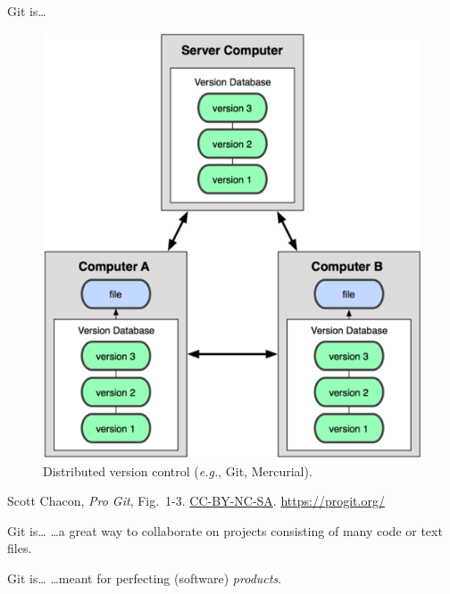 \begin{frame}{Git is\ldots}
  \begin{figure}
    \includegraphics[scale=0.8]{18333fig0103-tn.png}
    \\ Distributed version control (\emph{e.g.}, Git, Mercurial).
  \end{figure}
  \footnotesize{Scott Chacon,
    \emph{Pro Git},
    Fig.~1-3.
    \href{https://creativecommons.org/licenses/by-nc-sa/3.0/legalcode}{CC-BY-NC-SA}.
    \href{https://progit.org/}{https://progit.org/}}

\end{frame}

\begin{frame}{Git is\ldots}
  \hangindent=26pt \huge {
  \ldots a great way to collaborate on projects consisting of
    many code or text files.
  }
\end{frame}

\begin{frame}{Git is\ldots}
  \hangindent=26pt \huge {
  \ldots meant for perfecting (software) \emph{products}.
  }
\end{frame}

